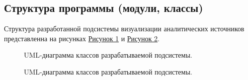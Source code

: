 \documentclass[a4paper]{extarticle}
\begin{document}
\subsection{Структура программы (модули, классы)}
Структура разработанной подсистемы визуализации аналитических источников представленна на рисунках \hyperref[umlClassDiagram:ris1]{Рисунок 1} и \hyperref[umlClassDiagram:ris2]{Рисунок 2}.
\begin{figure}[H]
\caption{UML-диаграмма классов разрабатываемой подсистемы.}
\label{umlClassDiagram:ris1}
\end{figure}\par
\begin{figure}[H]
\caption{UML-диаграмма классов разрабатываемой подсистемы.}
\label{umlClassDiagram:ris2}
\end{figure}\par
\end{document}
